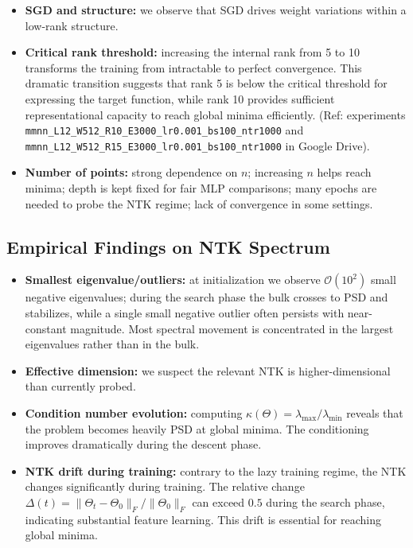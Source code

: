 \documentclass[12pt]{article}
\begin{document}
\begin{itemize}
    \item \textbf{SGD and structure:} we observe that SGD drives weight variations within a low-rank structure.\\
    
    \item \textbf{Critical rank threshold:} increasing the internal rank from 5 to 10 transforms the training from intractable to perfect convergence. This dramatic transition suggests that rank 5 is below the critical threshold for expressing the target function, while rank 10 provides sufficient representational capacity to reach global minima efficiently. (Ref: experiments \texttt{mmnn\_L12\_W512\_R10\_E3000\_lr0.001\_bs100\_ntr1000} and \texttt{mmnn\_L12\_W512\_R15\_E3000\_lr0.001\_bs100\_ntr1000} in Google Drive).\\
    
    \item \textbf{Number of points:} strong dependence on $n$; increasing $n$ helps reach minima; depth is kept fixed for fair MLP comparisons; many epochs are needed to probe the NTK regime; lack of convergence in some settings.\\
\end{itemize}

\subsection{Empirical Findings on NTK Spectrum}

\begin{itemize}
    \item \textbf{Smallest eigenvalue/outliers:} at initialization we observe $\mathcal{O}(10^2)$ small negative eigenvalues; during the search phase the bulk crosses to PSD and stabilizes, while a single small negative outlier often persists with near-constant magnitude. Most spectral movement is concentrated in the largest eigenvalues rather than in the bulk.\\
    
    \item \textbf{Effective dimension:} we suspect the relevant NTK is higher-dimensional than currently probed.\\
    
    \item \textbf{Condition number evolution:} computing $\kappa(\Theta) = \lambda_{\max} / \lambda_{\min}$ reveals that the problem becomes heavily PSD at global minima. The conditioning improves dramatically during the descent phase.\\
    
    \item \textbf{NTK drift during training:} contrary to the lazy training regime, the NTK changes significantly during training. The relative change $\Delta(t) = \|\Theta_t - \Theta_0\|_F/\|\Theta_0\|_F$ can exceed $0.5$ during the search phase, indicating substantial feature learning. This drift is essential for reaching global minima.\\
\end{itemize}
\end{document}
